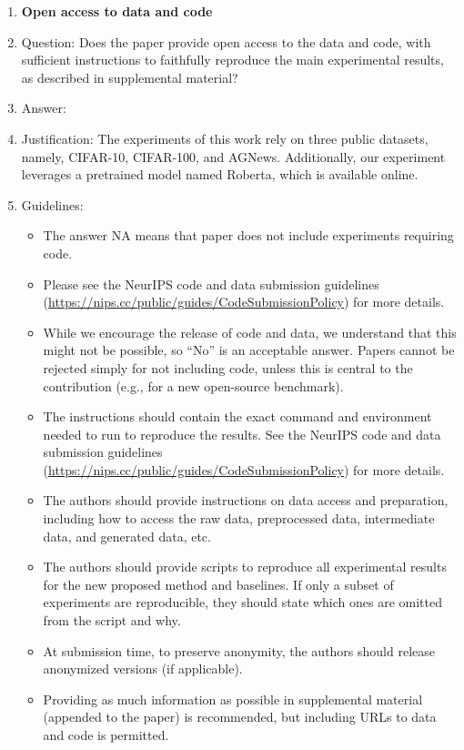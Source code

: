 \documentclass{article}
\theoremstyle{plain}
\theoremstyle{definition}
\theoremstyle{remark}
\begin{document}
\begin{enumerate}
\item {\bf Open access to data and code}
    \item[] Question: Does the paper provide open access to the data and code, with sufficient instructions to faithfully reproduce the main experimental results, as described in supplemental material?
    \item[] Answer: \answerYes{} %
    \item[] Justification: The experiments of this work rely on three public datasets, namely, CIFAR-10, CIFAR-100, and AGNews. Additionally, our experiment leverages a pretrained model named Roberta, which is available online. 
    \item[] Guidelines:
    \begin{itemize}
        \item The answer NA means that paper does not include experiments requiring code.
        \item Please see the NeurIPS code and data submission guidelines (\url{https://nips.cc/public/guides/CodeSubmissionPolicy}) for more details.
        \item While we encourage the release of code and data, we understand that this might not be possible, so “No” is an acceptable answer. Papers cannot be rejected simply for not including code, unless this is central to the contribution (e.g., for a new open-source benchmark).
        \item The instructions should contain the exact command and environment needed to run to reproduce the results. See the NeurIPS code and data submission guidelines (\url{https://nips.cc/public/guides/CodeSubmissionPolicy}) for more details.
        \item The authors should provide instructions on data access and preparation, including how to access the raw data, preprocessed data, intermediate data, and generated data, etc.
        \item The authors should provide scripts to reproduce all experimental results for the new proposed method and baselines. If only a subset of experiments are reproducible, they should state which ones are omitted from the script and why.
        \item At submission time, to preserve anonymity, the authors should release anonymized versions (if applicable).
        \item Providing as much information as possible in supplemental material (appended to the paper) is recommended, but including URLs to data and code is permitted.
    \end{itemize}



\end{enumerate}
\end{document}
